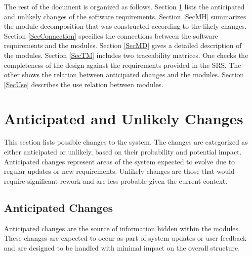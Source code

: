 \documentclass[12pt, titlepage]{article}
\begin{document}
The rest of the document is organized as follows. Section
\ref{SecChange} lists the anticipated and unlikely changes of the software
requirements. Section \ref{SecMH} summarizes the module decomposition that
was constructed according to the likely changes. Section \ref{SecConnection}
specifies the connections between the software requirements and the
modules. Section \ref{SecMD} gives a detailed description of the
modules. Section \ref{SecTM} includes two traceability matrices. One checks
the completeness of the design against the requirements provided in the SRS. The
other shows the relation between anticipated changes and the modules. Section
\ref{SecUse} describes the use relation between modules.

\section{Anticipated and Unlikely Changes} \label{SecChange}

This section lists possible changes to the system. The changes are categorized as either anticipated or unlikely, based on their probability and potential impact. Anticipated changes represent areas of the system expected to evolve due to regular updates or new requirements. Unlikely changes are those that would require significant rework and are less probable given the current context.

\subsection{Anticipated Changes} \label{SecAchange}

Anticipated changes are the source of information hidden within the modules. These changes are expected to occur as part of system updates or user feedback and are designed to be handled with minimal impact on the overall structure.
\end{document}
